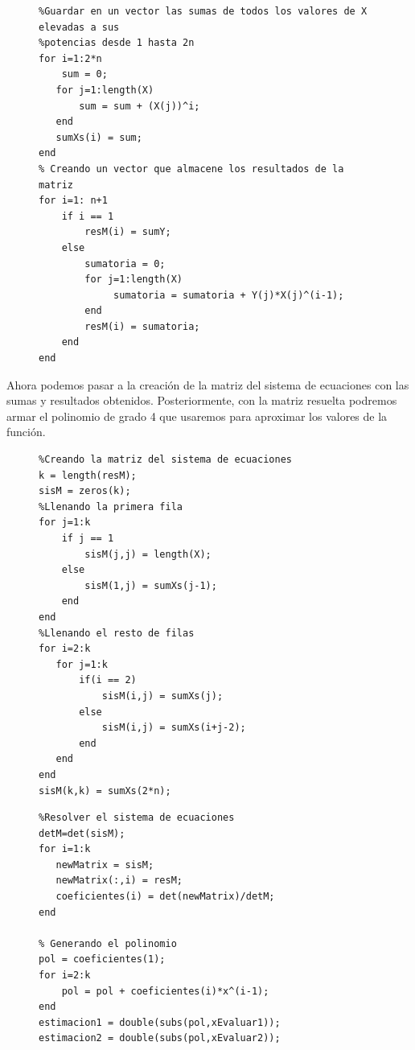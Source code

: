 \documentclass[11pt,letterpaper]{article}
\begin{document}
\begin{figure}[H]
\begin{tcolorbox}[title = Problema 5: Vector de sumas y vector de resultados]
\begin{verbatim}
%Guardar en un vector las sumas de todos los valores de X elevadas a sus
%potencias desde 1 hasta 2n 
for i=1:2*n
    sum = 0;
   for j=1:length(X)
       sum = sum + (X(j))^i;
   end
   sumXs(i) = sum;
end
% Creando un vector que almacene los resultados de la matriz
for i=1: n+1
    if i == 1
        resM(i) = sumY; 
    else
        sumatoria = 0;
        for j=1:length(X)
             sumatoria = sumatoria + Y(j)*X(j)^(i-1);
        end
        resM(i) = sumatoria;
    end
end
\end{verbatim}
\end{tcolorbox}
\end{figure}

Ahora podemos pasar a la creación de la matriz del sistema de ecuaciones con las sumas y resultados obtenidos. Posteriormente, con la matriz resuelta podremos armar el polinomio de grado 4 que usaremos para aproximar los valores de la función.
\begin{figure}[H]
\begin{tcolorbox}[title = Problema 5: Creación de la matriz del sistema de ecuaciones]
\begin{verbatim}
%Creando la matriz del sistema de ecuaciones
k = length(resM);
sisM = zeros(k);
%Llenando la primera fila
for j=1:k
    if j == 1
        sisM(j,j) = length(X);
    else
        sisM(1,j) = sumXs(j-1);
    end
end
%Llenando el resto de filas
for i=2:k
   for j=1:k
       if(i == 2)
           sisM(i,j) = sumXs(j);
       else
           sisM(i,j) = sumXs(i+j-2);
       end
   end
end
sisM(k,k) = sumXs(2*n);
\end{verbatim}
\end{tcolorbox}
\end{figure}
\begin{figure}[H]
\begin{tcolorbox}[title = Problema 5: Resolución de la matriz del sistema y generación del polinomio]
\begin{verbatim}
%Resolver el sistema de ecuaciones
detM=det(sisM);
for i=1:k
   newMatrix = sisM;
   newMatrix(:,i) = resM;
   coeficientes(i) = det(newMatrix)/detM;
end

% Generando el polinomio
pol = coeficientes(1);
for i=2:k
    pol = pol + coeficientes(i)*x^(i-1);
end
estimacion1 = double(subs(pol,xEvaluar1));
estimacion2 = double(subs(pol,xEvaluar2));
\end{verbatim}
\end{tcolorbox}
\end{figure}
\end{document}

